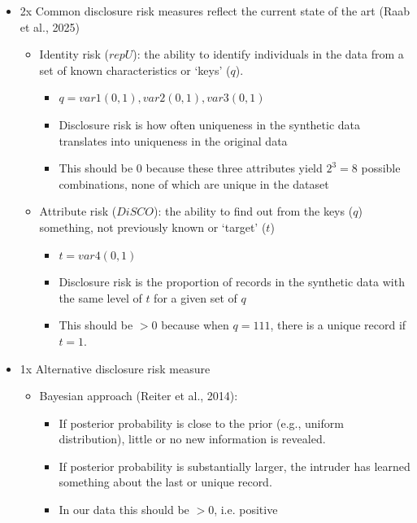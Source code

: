 \documentclass[t,8pt,utfx8]{beamer}
\begin{document}
\begin{spacing}{1.25}
\begin{frame}[t]
\begin{itemize}
    \item 2x Common disclosure risk measures reflect the current state of the art  (Raab et al., 2025)
    \begin{itemize}
        \item Identity risk ($repU$): the ability to identify individuals in the data from a set of known characteristics or `keys' ($q$).  
        \begin{itemize}
            \item  $q=var1(0,1), var2(0,1), var3(0,1)$ 
            \item Disclosure risk is how often uniqueness in the synthetic data translates into uniqueness in the original data
            \item This should be 0 because these three attributes yield $2^3 = 8$ possible combinations, none of which are unique in the dataset
        \end{itemize}
        \item Attribute risk ($DiSCO$): the ability to find out from the keys ($q$) something, not previously known or `target' ($t$)
        \begin{itemize}
            \item $t=var4(0,1)$
            \item Disclosure risk is the proportion of records in the synthetic data with the same level of $t$ for a given set of $q$
            \item This should be $>0$ because when $q=111$, there is a unique record if $t=1$. 
        \end{itemize}
    \end{itemize}
    \item 1x Alternative disclosure risk measure
    \begin{itemize}
        \item Bayesian approach (Reiter et al., 2014):   
        \begin{itemize}
            \item If posterior probability is close to the prior (e.g., uniform distribution), little or no new information is revealed.  
            \item If posterior probability is substantially larger, the intruder has learned something about the last or unique record.  
            \item In our data this should be $>0$, i.e. positive
        \end{itemize}
    \end{itemize}
\end{itemize}
\end{frame}


\end{spacing}
\end{document}
